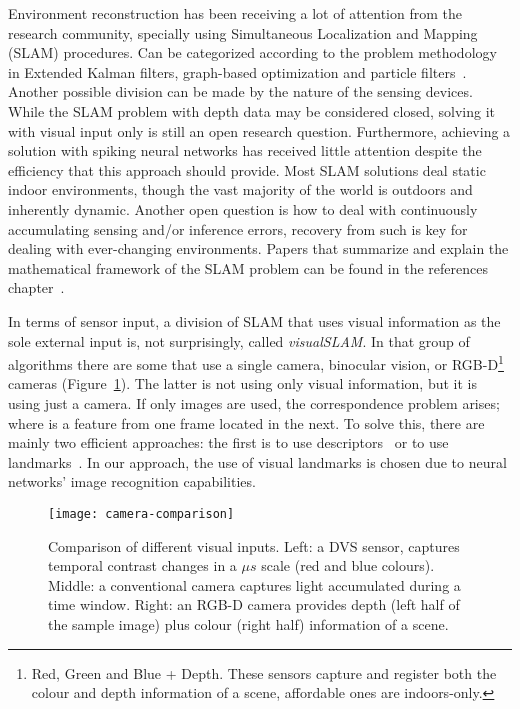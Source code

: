 Environment reconstruction has been receiving a lot of attention from the research  community, specially using Simultaneous Localization and Mapping (SLAM) procedures. Can be categorized according to the problem methodology in Extended Kalman filters, graph-based optimization and particle filters~\cite{Thrun2008_SLAM}. Another possible division can be made by the nature of the sensing devices. While the SLAM problem with depth data may be considered closed, solving it with visual input only is still an open research question. Furthermore, achieving a solution with spiking neural networks has received little attention despite the efficiency that this approach should provide. Most SLAM solutions deal static indoor environments, though the vast majority of the world is outdoors and inherently dynamic. Another open question is how to deal with continuously accumulating sensing and/or inference errors, recovery from such is key for dealing with ever-changing environments. Papers that summarize and explain the mathematical framework of the SLAM problem can be found in the references chapter~\cite{Thrun2008_SLAM,Fuentes-Pacheco2012-slam,durrant2006simultaneous,bailey2006simultaneous}. 

In terms of sensor input, a division of SLAM that uses visual information as the sole external input is, not surprisingly, called \emph{visualSLAM}. In that group of algorithms  there are some that use a single camera, binocular vision, or RGB-D\footnote{Red, Green and Blue + Depth. These sensors capture and register both the colour and depth information of a scene, affordable ones are indoors-only.} cameras (Figure~\ref{fig:slam:camera-comparison}). The latter is not using only visual information, but it is using just a camera. If only images are used, the correspondence problem arises; where is a feature from one frame located in the next. To solve this, there are mainly two efficient approaches: the first is to use descriptors~\cite{lowe1999object,bay2006surf,alahi2012freak} or to use landmarks~\cite{sola2012impact,frintrop2006attentional}. In our approach, the use of visual landmarks is chosen due to neural networks' image recognition capabilities. 

\begin{figure}[h]
  \begin{center}
    \texttt{[image: camera-comparison]}
    \caption{Comparison of different visual inputs. Left: a DVS sensor, captures temporal contrast changes in a $\mu s$ scale (red and blue colours). Middle: a conventional camera captures light accumulated during a time window. Right: an RGB-D camera provides depth (left half of the sample image) plus colour (right half) information of a scene.}
    \label{fig:slam:camera-comparison}
  \end{center}
\end{figure}

